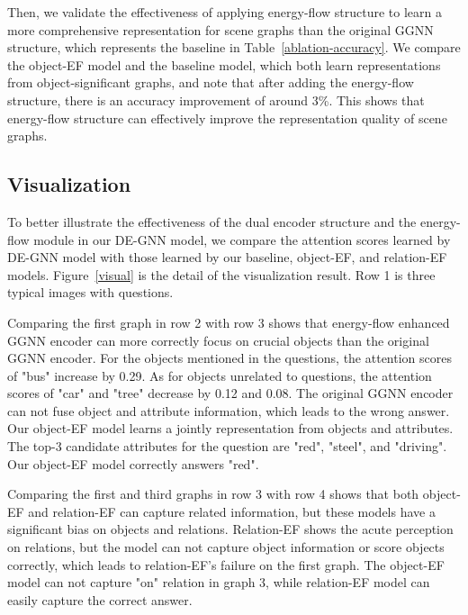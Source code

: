\documentclass[letterpaper]{article} %
\begin{document}
Then, we validate the effectiveness of applying energy-flow structure to learn a more comprehensive representation for scene graphs than the original GGNN structure, which represents the baseline in Table~\ref{ablation-accuracy}. We compare the object-EF model and the baseline model, which both learn representations from object-significant graphs, and note that after adding the energy-flow structure, there is an accuracy improvement of around 3\%. 
This shows that energy-flow structure can effectively improve the representation quality of scene graphs. 


\subsection{Visualization}
To better illustrate the effectiveness of the dual encoder structure and the energy-flow module in our DE-GNN model, we compare the attention scores learned by DE-GNN model with those learned by our baseline, object-EF, and relation-EF models. Figure~\ref{visual} is the detail of the visualization result. Row 1 is three typical images with questions. 

Comparing the first graph in row 2 with row 3 shows that energy-flow enhanced GGNN encoder can more correctly focus on crucial objects than the original GGNN encoder. For the objects mentioned in the questions, the attention scores of "bus" increase by 0.29. As for objects unrelated to questions, the attention scores of "car" and "tree" decrease by 0.12 and 0.08. The original GGNN encoder can not fuse object and attribute information, which leads to the wrong answer. Our object-EF model learns a jointly representation from objects and attributes. The top-3 candidate attributes for the question are "red", "steel", and "driving". Our object-EF model correctly answers "red".

Comparing the first and third graphs in row 3 with row 4 shows that both object-EF and relation-EF can capture related information, but these models have a significant bias on objects and relations. Relation-EF shows the acute perception on relations, but the model can not capture object information or score objects correctly, which leads to relation-EF's failure on the first graph. The object-EF model can not capture "on" relation in graph 3, while relation-EF model can easily capture the correct answer.
\end{document}
